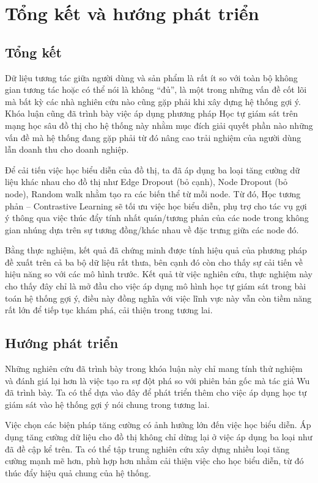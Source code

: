 \chapter{Tổng kết và hướng phát triển} \label{Chapter5}

\section{Tổng kết}

\noindent Dữ liệu tương tác giữa người dùng và sản phẩm là rất ít so với toàn bộ không gian tương tác hoặc có thể nói là không ``đủ'', là một trong những vấn đề cốt lõi mà bất kỳ các nhà nghiên cứu nào cũng gặp phải khi xây dựng hệ thống gợi ý. Khóa luận cũng đã trình bày việc áp dụng phương pháp Học tự giám sát trên mạng học sâu đồ thị cho hệ thống này nhằm mục đích giải quyết phần nào những vấn đề mà hệ thống đang gặp phải từ đó nâng cao trải nghiệm của người dùng lẫn doanh thu cho doanh nghiệp.

Để cải tiến việc học biểu diễn của đồ thị, ta đã áp dụng ba loại tăng cường dữ liệu khác nhau cho đồ thị như Edge Dropout (bỏ cạnh), Node Dropout (bỏ node), Random walk nhằm tạo ra các biến thể từ mỗi node. Từ đó, Học tương phản -- Contrastive Learning sẽ tối ưu việc học biểu diễn, phụ trợ cho tác vụ gợi ý thông qua việc thúc đẩy tính nhất quán/tương phản của các node trong không gian nhúng dựa trên sự tương đồng/khác nhau về đặc trưng giữa các node đó.

Bằng thực nghiệm, kết quả đã chứng minh được tính hiệu quả của phương pháp đề xuất trên cả ba bộ dữ liệu rất thưa, bên cạnh đó còn cho thấy sự cải tiến về hiệu năng so với các mô hình trước. Kết quả từ việc nghiên cứu, thực nghiệm này cho thấy đây chỉ là mở đầu cho việc áp dụng mô hình học tự giám sát trong bài toán hệ thống gợi ý, điều này đồng nghĩa với việc lĩnh vực này vẫn còn tiềm năng rất lớn để tiếp tục khám phá, cải thiện trong tương lai.

\section{Hướng phát triển}

\noindent Những nghiên cứu đã trình bày trong khóa luận này chỉ mang tính thử nghiệm và đánh giá lại hơn là việc tạo ra sự đột phá so với phiên bản gốc mà tác giả Wu đã trình bày. Ta có thể dựa vào đây để phát triển thêm cho việc áp dụng học tự giám sát vào hệ thống gợi ý nói chung trong tương lai. 

Việc chọn các biện pháp tăng cường có ảnh hưởng lớn đến việc học biểu diễn. Áp dụng tăng cường dữ liệu cho đồ thị không chỉ dừng lại ở việc áp dụng ba loại như đã đề cập kể trên. Ta có thể tập trung nghiên cứu xây dựng nhiều loại tăng cường mạnh mẽ hơn, phù hợp hơn nhằm cải thiện việc cho học biểu diễn, từ đó thúc đẩy hiệu quả chung của hệ thống.
    
